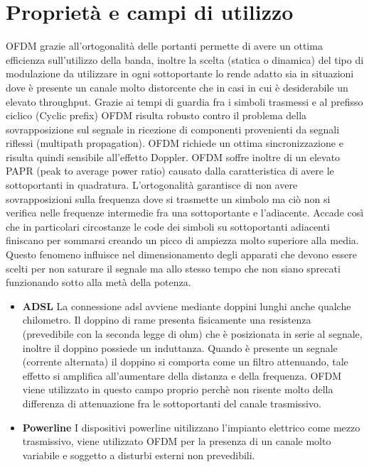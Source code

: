 \begin{itemize}
	
\label{sec:problem}
\section{Proprietà e campi di utilizzo}
OFDM grazie all'ortogonalità delle portanti permette di avere un ottima efficienza sull'utilizzo della banda, inoltre la scelta (statica o dinamica) del tipo di modulazione da utilizzare in ogni sottoportante lo rende adatto sia in situazioni dove è presente un canale molto distorcente che in casi in cui è desiderabile un elevato throughput. Grazie ai tempi di guardia fra i simboli trasmessi e al prefisso ciclico (Cyclic prefix) OFDM risulta robusto contro il problema della sovrapposizione sul segnale in ricezione di componenti provenienti da segnali riflessi (multipath propagation). OFDM richiede un ottima sincronizzazione e risulta quindi sensibile all'effetto Doppler. OFDM soffre inoltre di un elevato PAPR (peak to average power ratio) causato dalla caratteristica di avere le sottoportanti in quadratura. L'ortogonalità garantisce di non avere sovrapposizioni sulla frequenza dove si trasmette un simbolo ma ciò non si verifica nelle frequenze intermedie fra una sottoportante e l'adiacente. Accade così che in particolari circostanze le code dei simboli su sottoportanti adiacenti finiscano per sommarsi creando un picco di ampiezza molto superiore alla media. Questo fenomeno influisce nel dimensionamento degli apparati che devono essere scelti per non saturare il segnale ma allo stesso tempo che non siano sprecati funzionando sotto alla metà della potenza.
\cite{papr}
\begin{itemize}
	\item \textbf{ADSL} La connessione adsl avviene mediante doppini lunghi anche qualche chilometro. Il doppino di rame presenta fisicamente una resistenza (prevedibile con la seconda legge di ohm) che è posizionata in serie al segnale, inoltre il doppino possiede un induttanza. Quando è presente un segnale (corrente alternata) il doppino si comporta come un filtro attenuando, tale effetto si amplifica all'aumentare della distanza e della frequenza. OFDM viene utilizzato in questo campo proprio perchè non risente molto della differenza di attenuazione fra le sottoportanti del canale trasmissivo.
\end{itemize}
\begin{itemize}
	\item \textbf{Powerline} I dispositivi powerline uitilizzano l'impianto elettrico come mezzo trasmissivo, viene utilizzato OFDM per la presenza di un canale molto variabile e soggetto a disturbi esterni non prevedibili.

\end{itemize}
\end{itemize}
